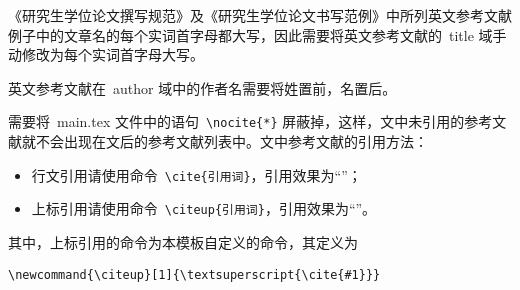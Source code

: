 《研究生学位论文撰写规范》及《研究生学位论文书写范例》中所列英文参考文献例子中的文章名的每个实词首字母都大写，因此需要将英文参考文献的~title 域手动修改为每个实词首字母大写。

英文参考文献在~author 域中的作者名需要将姓置前，名置后。

需要将~main.tex 文件中的语句~\verb|\nocite{*}| 屏蔽掉，这样，文中未引用的参考文献就不会出现在文后的参考文献列表中。文中参考文献的引用方法：

\begin{itemize}
\item 行文引用请使用命令~\verb|\cite{引用词}|，引用效果为“\cite{lin1992}”；
\item 上标引用请使用命令~\verb|\citeup{引用词}|，引用效果为“”。
\end{itemize}
其中，上标引用的命令为本模板自定义的命令，其定义为
\begin{verbatim}
\newcommand{\citeup}[1]{\textsuperscript{\cite{#1}}}
\end{verbatim}

